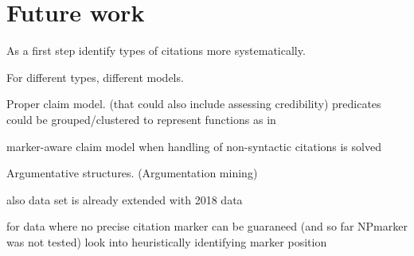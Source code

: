 \chapter{Future work}
As a first step identify types of citations more systematically.

For different types, different models.

Proper claim model. (that could also include assessing credibility\cite{Popat2016})
predicates could be grouped/clustered to represent functions as in \cite{Gabor2018}

marker-aware claim model when handling of non-syntactic citations is solved

Argumentative structures. (Argumentation mining\cite{Stab2016,Lippi2016,Habernal2017})

also data set is already extended with 2018 data\cite{Saier2019}

for data where no precise citation marker can be guaraneed (and so far NPmarker was not tested) look into heuristically identifying marker position
